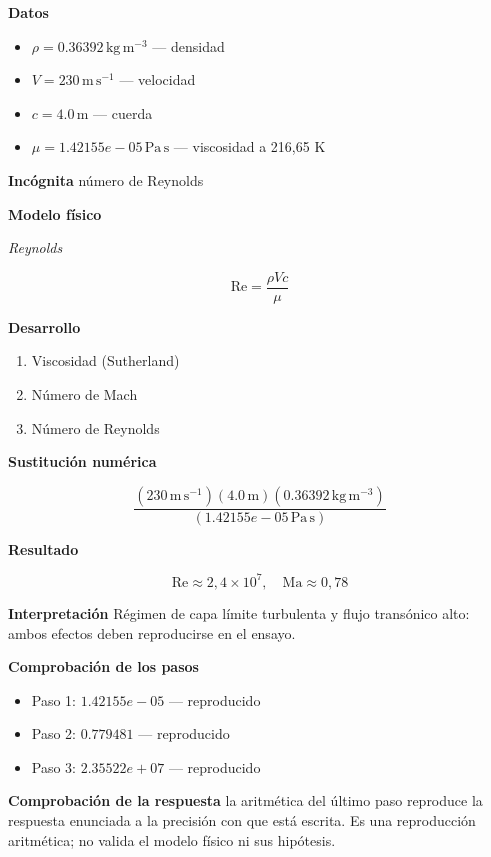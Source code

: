 \documentclass[10pt,openany]{book}
\begin{document}
\noindent\textbf{Datos}
\begin{itemize}
\item $\rho = 0.36392\,\mathrm{kg}\,\mathrm{m}^{-3}$ — densidad
\item $V = 230\,\mathrm{m}\,\mathrm{s}^{-1}$ — velocidad
\item $c = 4.0\,\mathrm{m}$ — cuerda
\item $\mu = 1.42155e-05\,\mathrm{Pa}\,\mathrm{s}$ — viscosidad a 216,65 K
\end{itemize}

\noindent\textbf{Incógnita}
número de Reynolds

\noindent\textbf{Modelo físico}

\noindent\textit{Reynolds}

\[
\mathrm{Re} = \frac{\rho V c}{\mu}
\]

\noindent\textbf{Desarrollo}
\begin{enumerate}
\item
Viscosidad (Sutherland)
\item
Número de Mach
\item
Número de Reynolds
\end{enumerate}

\noindent\textbf{Sustitución numérica}

\[
\frac{\left(230\,\mathrm{m}\,\mathrm{s}^{-1}\right) \left(4.0\,\mathrm{m}\right) \left(0.36392\,\mathrm{kg}\,\mathrm{m}^{-3}\right)}{\left(1.42155e-05\,\mathrm{Pa}\,\mathrm{s}\right)}
\]

\noindent\textbf{Resultado}

\[
\mathrm{Re} \approx 2{,}4\times 10^{7},\quad \mathrm{Ma} \approx 0{,}78
\]

\noindent\textbf{Interpretación}
Régimen de capa límite turbulenta y flujo transónico alto: ambos efectos deben reproducirse en el ensayo.

\noindent\textbf{Comprobación de los pasos}
\begin{itemize}
\item Paso 1: $1.42155e-05$ — reproducido
\item Paso 2: $0.779481$ — reproducido
\item Paso 3: $2.35522e+07$ — reproducido
\end{itemize}

\noindent\textbf{Comprobación de la respuesta} la aritmética del último paso reproduce la respuesta enunciada a la precisión con que está escrita. Es una reproducción aritmética; no valida el modelo físico ni sus hipótesis.
\end{document}
